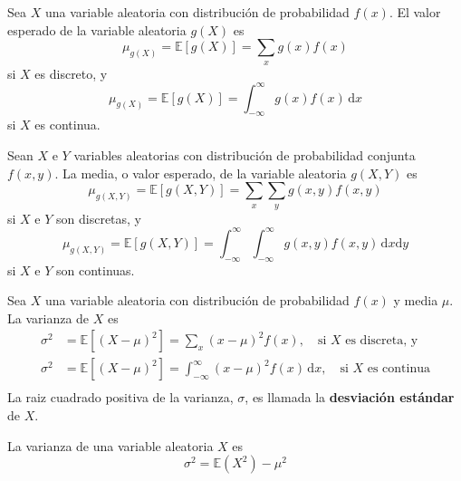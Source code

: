 \begin{theorem}[]
Sea $X$ una variable aleatoria con distribución de probabilidad $f(x)$. El valor esperado de la variable aleatoria $g(X)$ es
\begin{equation*}
\mu_{g\left(X\right)}=\mathds{E}\left[g\left(X\right)\right]=\sum_{x}g(x)f(x)
\end{equation*}
si $X$ es discreto, y
\begin{equation*}
\mu_{g\left(X\right)}=\mathds{E}\left[g\left(X\right)\right]=\int_{-\infty}^{\infty}g(x)f(x)\,\mathrm{d}x
\end{equation*}
si $X$ es continua.
\end{theorem}

\begin{definition}[]
Sean $X$ e $Y$ variables aleatorias con distribución de probabilidad conjunta $f\left(x,y\right)$. La media, o valor esperado, de la variable aleatoria $g\left(X,Y\right)$ es
\begin{equation*}
\mu_{g\left(X,Y\right)}=\mathds{E}\left[g\left(X,Y\right)\right]=\sum_{x}\sum_{y}g\left(x,y\right)f\left(x,y\right)
\end{equation*}
si $X$ e $Y$ son discretas, y
\begin{equation*}
\mu_{g\left(X,Y\right)}=\mathds{E}\left[g\left(X,Y\right)\right]=\int_{-\infty}^{\infty}\int_{-\infty}^{\infty}g\left(x,y\right)f\left(x,y\right)\,\mathrm{d}x\mathrm{d}y
\end{equation*}
si $X$ e $Y$ son continuas.
\end{definition}

\begin{definition}[]
Sea $X$ una variable aleatoria con distribución de probabilidad $f(x)$ y media $\mu$. La varianza de $X$ es
\begin{align*}
\sigma^{2}&=\mathds{E}\left[{\left(X-\mu\right)}^{2}\right]=\sum_{x}{\left(x-\mu\right)}^{2}f(x),\quad\text{si }X\text{ es discreta, y}\\
\sigma^{2}&=\mathds{E}\left[{\left(X-\mu\right)}^{2}\right]=\int_{-\infty}^{\infty}{\left(x-\mu\right)}^{2}f(x)\,\mathrm{d}x,\quad\text{si }X\text{ es continua}\\
\end{align*}
La raiz cuadrado positiva de la varianza, $\sigma$, es llamada la \textbf{desviación estándar} de $X$.
\end{definition}

\begin{theorem}[]
La varianza de una variable aleatoria $X$ es
\begin{equation*}
\sigma^{2}=\mathds{E}\left(X^{2}\right)-\mu^{2}
\end{equation*}
\end{theorem}

